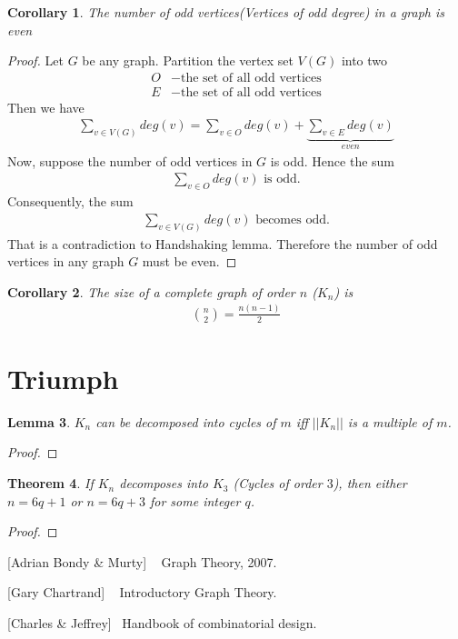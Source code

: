 \documentclass[	DIV=calc,%
							paper=a4,%
							fontsize=11pt,%
							twocolumn]{scrartcl}	 					%
\newtheorem{thm}{Theorem}[section]
\newtheorem{lem}[thm]{Lemma}
\newtheorem{cor}[thm]{Corollary}
\theoremstyle{definition}
\theoremstyle{plain}
\theoremstyle{remark}
\begin{document}
\begin{cor}
The number of odd vertices(Vertices of odd degree) in a graph is even
\end{cor}

\begin{proof}
Let $G$ be any graph. Partition the vertex set $V(G)$ into two
\begin{align*}
O&- \text{the set of all odd vertices}\\
E&-\text{the set of all odd vertices}
\end{align*}
Then we have
\begin{align}
\sum_{v\in V(G)}deg(v)=\sum_{v\in O}deg(v) + \underbrace{\sum_{v\in E}deg(v)}_{even}
\end{align}
Now, suppose the number of odd vertices in $G$ is odd. Hence the sum 
\begin{align*}
\sum_{v\in O}deg(v)\text{ is odd.}
\end{align*}
Consequently, the sum 
\begin{align*}
\sum_{v\in V(G)}deg(v)\text{ becomes odd.}
\end{align*}
That is a contradiction to Handshaking lemma. Therefore the number of odd vertices in any graph $G$ must be even.
\end{proof}
\begin{cor}
The size of a complete graph of order $n$ ($K_n$) is
\begin{align}
\binom{n}{2}=\frac{n(n-1)}{2}
\end{align} 
\end{cor}

\section{Triumph}

\begin{lem}
$K_n$ can be decomposed into cycles of $m$ iff $||K_n||$ is a multiple of $m$.
\end{lem}

\begin{proof}

\end{proof}


\begin{thm}
If $K_n$ decomposes into $K_3$ (Cycles of order $3$), then either $n=6q+1$ or $n=6q+3$ for some integer $q$.
\end{thm}

\begin{proof}

\end{proof}

\begin{thebibliography}{9}

[Adrian Bondy \& Murty] ~
Graph Theory, 2007.


[Gary Chartrand]  ~
Introductory Graph Theory.

[Charles \& Jeffrey]~
Handbook of combinatorial design.
\end{thebibliography}
\end{document}
